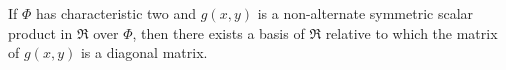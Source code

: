 If $\Phi$ has characteristic two and $g(x,y)$ is a non-alternate symmetric scalar product in $\mathfrak{R}$ over $\Phi$, then there exists a basis of $\mathfrak{R}$ relative to which the matrix of $g(x,y)$ is a diagonal matrix.
